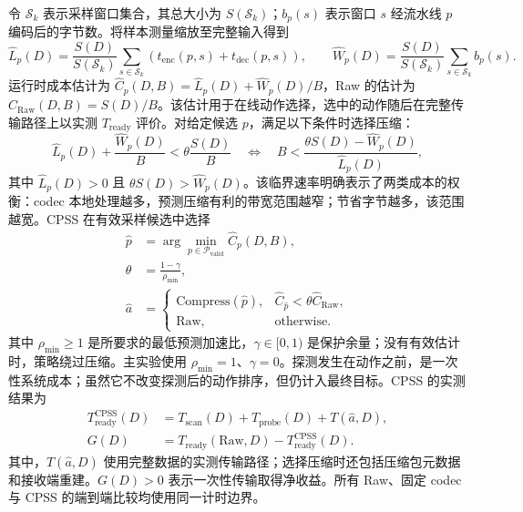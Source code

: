 \documentclass[smallabstract,smallcaptions]{dccpaper}
\begin{document}
令 $\mathcal{S}_k$ 表示采样窗口集合，其总大小为 $S(\mathcal{S}_k)$；$b_p(s)$ 表示窗口 $s$ 经流水线 $p$ 编码后的字节数。将样本测量缩放至完整输入得到
\begin{equation}
\widehat{L}_p(D)=\frac{S(D)}{S(\mathcal{S}_k)}\sum_{s\in\mathcal{S}_k}\left(t_{\mathrm{enc}}(p,s)+t_{\mathrm{dec}}(p,s)\right),\qquad
\widehat{W}_p(D)=\frac{S(D)}{S(\mathcal{S}_k)}\sum_{s\in\mathcal{S}_k}b_p(s).
\end{equation}
运行时成本估计为 $\widehat{C}_p(D,B)=\widehat{L}_p(D)+\widehat{W}_p(D)/B$，Raw 的估计为 $\widehat{C}_{\mathrm{Raw}}(D,B)=S(D)/B$。该估计用于在线动作选择，选中的动作随后在完整传输路径上以实测 $T_{\mathrm{ready}}$ 评价。对给定候选 $p$，满足以下条件时选择压缩：
\begin{equation}
\widehat{L}_p(D)+\frac{\widehat{W}_p(D)}{B}<\theta\frac{S(D)}{B}
\quad\Longleftrightarrow\quad
B<\frac{\theta S(D)-\widehat{W}_p(D)}{\widehat{L}_p(D)},
\label{eq:break-even}
\end{equation}
其中 $\widehat{L}_p(D)>0$ 且 $\theta S(D)>\widehat{W}_p(D)$。该临界速率明确表示了两类成本的权衡：codec 本地处理越多，预测压缩有利的带宽范围越窄；节省字节越多，该范围越宽。CPSS 在有效采样候选中选择
\begin{equation}
\begin{aligned}
\hat p&=\arg\min_{p\in\mathcal{P}_{\mathrm{valid}}}\widehat{C}_p(D,B),\\
\theta&=\frac{1-\gamma}{\rho_{\min}},\\
\hat a&=\begin{cases}
\mathrm{Compress}(\hat p), & \widehat{C}_{\hat p}<\theta\widehat{C}_{\mathrm{Raw}},\\
\mathrm{Raw}, & \text{otherwise}.
\end{cases}
\end{aligned}
\end{equation}
其中 $\rho_{\min}\ge 1$ 是所要求的最低预测加速比，$\gamma\in[0,1)$ 是保护余量；没有有效估计时，策略绕过压缩。主实验使用 $\rho_{\min}=1$、$\gamma=0$。探测发生在动作之前，是一次性系统成本；虽然它不改变探测后的动作排序，但仍计入最终目标。CPSS 的实测结果为
\begin{equation}
\begin{aligned}
T_{\mathrm{ready}}^{\mathrm{CPSS}}(D)
 &=T_{\mathrm{scan}}(D)+T_{\mathrm{probe}}(D)+T(\hat a,D),\\
G(D)&=T_{\mathrm{ready}}(\mathrm{Raw},D)-T_{\mathrm{ready}}^{\mathrm{CPSS}}(D).
\end{aligned}
\end{equation}
其中，$T(\hat a,D)$ 使用完整数据的实测传输路径；选择压缩时还包括压缩包元数据和接收端重建。$G(D)>0$ 表示一次性传输取得净收益。所有 Raw、固定 codec 与 CPSS 的端到端比较均使用同一计时边界。
\end{document}
